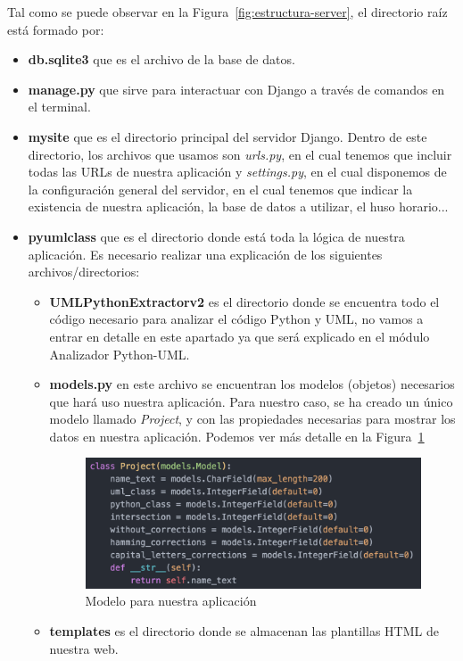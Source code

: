 \documentclass[a4paper, 12pt]{book}
\begin{document}
Tal como se puede observar en la Figura~\ref{fig:estructura-server}, el directorio raíz
está formado por:
\begin{itemize}
  \item \textbf{db.sqlite3} que es el archivo de la base de datos.
  \item \textbf{manage.py} que sirve para interactuar con Django a través de comandos en el terminal.
  \item \textbf{mysite} que es el directorio principal del servidor Django. Dentro de este directorio,
  los archivos que usamos son \textit{urls.py}, en el cual tenemos que incluir todas las
  URLs de nuestra aplicación y \textit{settings.py}, en el cual disponemos de la configuración general del servidor,
  en el cual tenemos que indicar la existencia de nuestra aplicación, la base de datos a utilizar, el huso horario...
  \item \textbf{pyumlclass} que es el directorio donde está toda la lógica de nuestra aplicación. Es necesario realizar
  una explicación de los siguientes archivos/directorios:
  \begin{itemize}
    \item \textbf{UMLPythonExtractorv2} es el directorio donde se encuentra todo el código necesario para analizar
    el código Python y UML, no vamos a entrar en detalle en este apartado ya que será explicado en el módulo Analizador
    Python-UML.
    \item \textbf{models.py} en este archivo se encuentran los modelos (objetos) necesarios que hará uso nuestra aplicación.
    Para nuestro caso, se ha creado un único modelo llamado \emph{Project}, y con las propiedades necesarias para mostrar los
    datos en nuestra aplicación. Podemos ver más detalle en la Figura~\ref{fig:project-model}
    \begin{figure}[htb]
      \centering
      \includegraphics[width=12cm, keepaspectratio]{img/project-model}
      \caption{Modelo para nuestra aplicación}
      \label{fig:project-model}
    \end{figure}
    \item \textbf{templates} es el directorio donde se almacenan las plantillas HTML de nuestra web.

\end{itemize}
\end{itemize}
\end{document}
